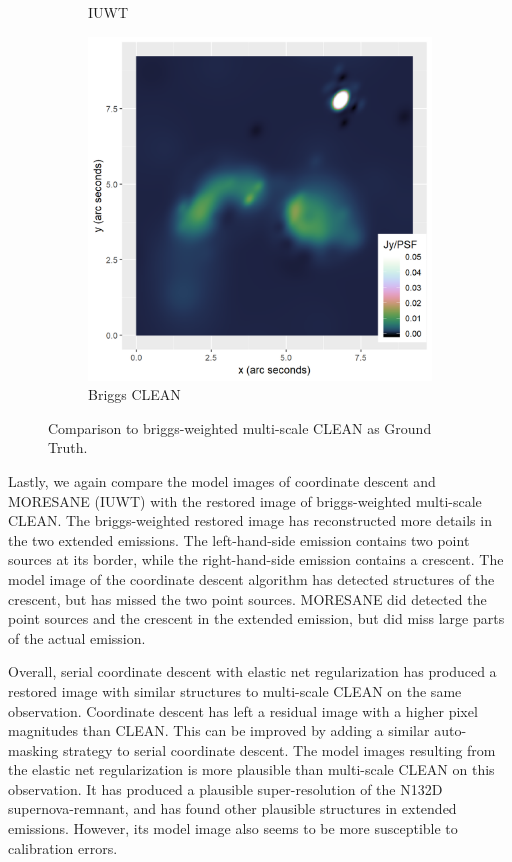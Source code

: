 \begin{figure}[h]
\begin{subfigure}[b]{0.3\linewidth}
		\caption{IUWT}
	\end{subfigure}
	\begin{subfigure}[b]{0.3\linewidth}
		\includegraphics[width=1.00\linewidth]{./chapters/10.results/MSClean/Briggs-Calibration.png}
		\caption{Briggs CLEAN}
	\end{subfigure}

	\caption{Comparison to briggs-weighted multi-scale CLEAN as Ground Truth.}
	\label{results:cleancomp::calib:figure}
\end{figure}

Lastly, we again compare the model images of coordinate descent and MORESANE (IUWT) with the restored image of briggs-weighted multi-scale CLEAN. The briggs-weighted restored image has reconstructed more details in the two extended emissions. The left-hand-side emission contains two point sources at its border, while the right-hand-side emission contains a crescent. The model image of the coordinate descent algorithm has detected structures of the crescent, but has missed the two point sources. MORESANE did detected the point sources and the crescent in the extended emission, but did miss large parts of the actual emission.

Overall, serial coordinate descent with elastic net regularization has produced a restored image with similar structures to multi-scale CLEAN on the same observation. Coordinate descent has left a residual image with a higher pixel magnitudes than CLEAN. This can be improved by adding a similar auto-masking strategy to serial coordinate descent. The model images resulting from the elastic net regularization is more plausible than multi-scale CLEAN on this observation. It has produced a plausible super-resolution of the N132D supernova-remnant, and has found other plausible structures in extended emissions. However, its model image also seems to be more susceptible to calibration errors. 

